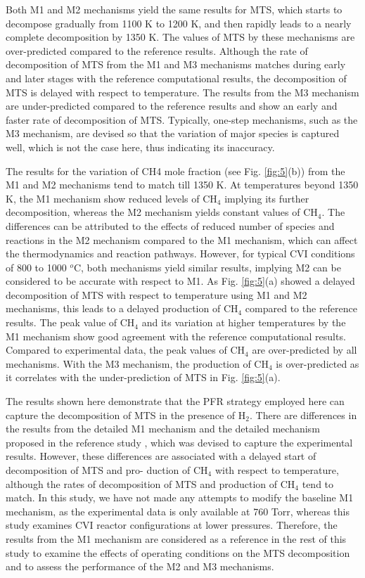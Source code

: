 \documentclass[final, letterpaper, square, comma, numbers, sort&compress]{elsarticle}
\begin{document}
Both M1 and M2 mechanisms yield the same results for MTS, which starts to decompose gradually from 1100 K to 1200 K, and then rapidly leads to a nearly complete decomposition by 1350 K. The values of MTS by these mechanisms are over-predicted compared to the reference results. Although the rate of decomposition of MTS from the M1 and M3 mechanisms matches during early and later stages with the reference computational results, the decomposition of MTS is delayed with respect to temperature. The results from the M3 mechanism are under-predicted compared to the reference results and show an early and faster rate of decomposition of MTS. Typically, one-step mechanisms, such as the M3 mechanism, are devised so that the variation of major species is captured well, which is not the case here, thus indicating its inaccuracy.

The results for the variation of CH4 mole fraction (see Fig. \ref{fig:5}(b)) from the M1 and M2 mechanisms tend to match till 1350 K. At temperatures beyond 1350 K, the M1 mechanism show reduced levels of CH$_4$ implying its further decomposition, whereas the M2 mechanism yields constant values of CH$_4$. The differences can be attributed to the effects of reduced number of species and reactions in the M2 mechanism compared to the M1 mechanism, which can affect the thermodynamics and reaction pathways. However, for typical CVI conditions of 800 to 1000 $^o$C, both mechanisms yield similar results, implying M2 can be considered to be accurate with respect to M1. As Fig. \ref{fig:5}(a) showed a delayed decomposition of MTS with respect to temperature using M1 and M2 mechanisms, this leads to a delayed production of CH$_4$ compared to the reference results. The peak value of CH$_4$ and its variation at higher temperatures by the M1 mechanism show good agreement with the reference computational results. Compared to experimental data, the peak values of CH$_4$ are over-predicted by all mechanisms. With the M3 mechanism, the production of CH$_4$ is over-predicted as it correlates with the under-prediction of MTS in Fig. \ref{fig:5}(a).

The results shown here demonstrate that the PFR strategy employed here can capture the decomposition of MTS in the presence of H$_2$. There are differences in the results from the detailed M1 mechanism and the detailed mechanism proposed in the reference study \cite{Dang2022}, which was devised to capture the experimental results. However, these differences are associated with a delayed start of decomposition of MTS and pro- duction of CH$_4$ with respect to temperature, although the rates of decomposition of MTS and production of CH$_4$ tend to match. In this study, we have not made any attempts to modify the baseline M1 mechanism, as the experimental data is only available at 760 Torr, whereas this study examines CVI reactor configurations at lower pressures. Therefore, the results from the M1 mechanism are considered as a reference in the rest of this study to examine the effects of operating conditions on the MTS decomposition and to assess the performance of the M2 and M3 mechanisms.
\end{document}
